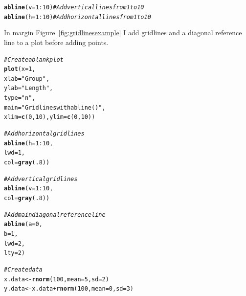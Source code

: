 \documentclass{tufte-book}\usepackage[]{graphicx}\usepackage[]{color}
\makeatletter
\newcommand{\hlnum}[1]{\textcolor[rgb]{0.686,0.059,0.569}{#1}}%
\newcommand{\hlstr}[1]{\textcolor[rgb]{0.192,0.494,0.8}{#1}}%
\newcommand{\hlcom}[1]{\textcolor[rgb]{0.678,0.584,0.686}{\textit{#1}}}%
\newcommand{\hlopt}[1]{\textcolor[rgb]{0,0,0}{#1}}%
\newcommand{\hlstd}[1]{\textcolor[rgb]{0.345,0.345,0.345}{#1}}%
\newcommand{\hlkwb}[1]{\textcolor[rgb]{0.69,0.353,0.396}{#1}}%
\newcommand{\hlkwc}[1]{\textcolor[rgb]{0.333,0.667,0.333}{#1}}%
\newcommand{\hlkwd}[1]{\textcolor[rgb]{0.737,0.353,0.396}{\textbf{#1}}}%
\newenvironment{kframe}{%
 \def\at@end@of@kframe{}%
 \ifinner\ifhmode%
  \def\at@end@of@kframe{\end{minipage}}%
  \begin{minipage}{\columnwidth}%
 \fi\fi%
 \def\FrameCommand##1{\hskip\@totalleftmargin \hskip-\fboxsep
 \colorbox{shadecolor}{##1}\hskip-\fboxsep
     \hskip-\linewidth \hskip-\@totalleftmargin \hskip\columnwidth}%
 \MakeFramed {\advance\hsize-\width
   \@totalleftmargin\z@ \linewidth\hsize
   \@setminipage}}%
 {\par\unskip\endMakeFramed%
 \at@end@of@kframe}
\newenvironment{knitrout}{}{} %
\makeatother
\begin{document}
\begin{knitrout}
\color{fgcolor}\begin{kframe}
\begin{alltt}
\hlkwd{abline}\hlstd{(}\hlkwc{v} \hlstd{=} \hlnum{1}\hlopt{:}\hlnum{10}\hlstd{)} \hlcom{# Add vertical lines from 1 to 10}
\hlkwd{abline}\hlstd{(}\hlkwc{h} \hlstd{=} \hlnum{1}\hlopt{:}\hlnum{10}\hlstd{)} \hlcom{# Add horizontal lines from 1 to 10}
\end{alltt}
\end{kframe}
\end{knitrout}

In margin Figure~\ref{fig:gridlinesexample} I add gridlines and a diagonal reference line to a plot before adding points.

\begin{marginfigure}
\begin{tiny}
\begin{knitrout}
\color{fgcolor}\begin{kframe}
\begin{alltt}
\hlcom{# Create a blank plot}
\hlkwd{plot}\hlstd{(}\hlkwc{x} \hlstd{=} \hlnum{1}\hlstd{,}
     \hlkwc{xlab} \hlstd{=} \hlstr{"Group"}\hlstd{,}
     \hlkwc{ylab} \hlstd{=} \hlstr{"Length"}\hlstd{,}
     \hlkwc{type} \hlstd{=} \hlstr{"n"}\hlstd{,}
     \hlkwc{main} \hlstd{=} \hlstr{"Gridlines with abline()"}\hlstd{,}
     \hlkwc{xlim} \hlstd{=} \hlkwd{c}\hlstd{(}\hlnum{0}\hlstd{,} \hlnum{10}\hlstd{),} \hlkwc{ylim} \hlstd{=} \hlkwd{c}\hlstd{(}\hlnum{0}\hlstd{,} \hlnum{10}\hlstd{))}

\hlcom{# Add horizontal gridlines}
\hlkwd{abline}\hlstd{(}\hlkwc{h} \hlstd{=} \hlnum{1}\hlopt{:}\hlnum{10}\hlstd{,}
       \hlkwc{lwd} \hlstd{=} \hlnum{1}\hlstd{,}
       \hlkwc{col} \hlstd{=} \hlkwd{gray}\hlstd{(}\hlnum{.8}\hlstd{))}

\hlcom{# Add vertical gridlines}
\hlkwd{abline}\hlstd{(}\hlkwc{v} \hlstd{=} \hlnum{1}\hlopt{:}\hlnum{10}\hlstd{,}
       \hlkwc{col} \hlstd{=} \hlkwd{gray}\hlstd{(}\hlnum{.8}\hlstd{))}

\hlcom{# Add main diagonal reference line}
\hlkwd{abline}\hlstd{(}\hlkwc{a} \hlstd{=} \hlnum{0}\hlstd{,}
       \hlkwc{b} \hlstd{=} \hlnum{1}\hlstd{,}
       \hlkwc{lwd} \hlstd{=} \hlnum{2}\hlstd{,}
       \hlkwc{lty} \hlstd{=} \hlnum{2}\hlstd{)}

\hlcom{# Create data}
\hlstd{x.data} \hlkwb{<-} \hlkwd{rnorm}\hlstd{(}\hlnum{100}\hlstd{,} \hlkwc{mean} \hlstd{=} \hlnum{5}\hlstd{,} \hlkwc{sd} \hlstd{=} \hlnum{2}\hlstd{)}
\hlstd{y.data} \hlkwb{<-} \hlstd{x.data} \hlopt{+} \hlkwd{rnorm}\hlstd{(}\hlnum{100}\hlstd{,} \hlkwc{mean} \hlstd{=} \hlnum{0}\hlstd{,} \hlkwc{sd} \hlstd{=} \hlnum{3}\hlstd{)}


\end{alltt}
\end{kframe}
\end{knitrout}
\end{tiny}
\end{marginfigure}
\end{document}
